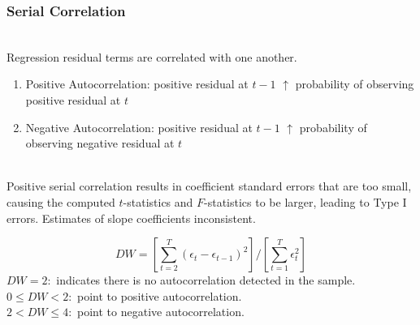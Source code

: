\subsubsection{Serial Correlation}

\begin{definition} \\
Regression residual terms are correlated with one another.
\begin{enumerate}[label=\roman*.]
\setlength{\itemsep}{0pt}
\item Positive Autocorrelation: positive residual at $t-1$ $\uparrow$ probability of observing positive residual at $t$
\item Negative Autocorrelation: positive residual at $t-1$ $\uparrow$ probability of observing negative residual at $t$
\end{enumerate}
\end{definition}

\begin{remark} \\
Positive serial correlation results in coefficient standard errors that are too small, causing the computed $t$-statistics and $F$-statistics to be larger, leading to Type I errors. Estimates of slope coefficients inconsistent.
\end{remark}

\begin{definition} 
\begin{equation}
DW = \left[ \sum\limits_{t=2}^T (\epsilon_t - \epsilon_{t-1})^2 \right] / \left[ \sum\limits_{t=1}^T \epsilon_t^2 \right] \nonumber
\end{equation}
$DW = 2:$ indicates there is no autocorrelation detected in the sample.\\
$0 \leq DW < 2:$ point to positive autocorrelation.\\
$2 < DW \leq 4:$ point to negative autocorrelation.
\end{definition}

